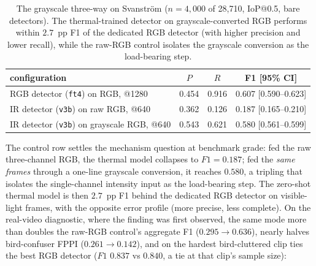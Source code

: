 \begin{table}[htbp]
    \centering
    \caption{The grayscale three-way on Svanstr\"om ($n=4{,}000$ of 28{,}710, IoP@0.5, bare detectors). The thermal-trained detector on grayscale-converted RGB performs within $2.7$~pp F1 of the dedicated RGB detector (with higher precision and lower recall), while the raw-RGB control isolates the grayscale conversion as the load-bearing step.}
    \label{tab:gray_threeway}
    \begin{tabular}{lccc}
        \toprule
        configuration & $P$ & $R$ & F1 [95\% CI] \\
        \midrule
        RGB detector (\texttt{ft4}) on RGB, @1280 & 0.454 & 0.916 & 0.607 [0.590--0.623] \\
        IR detector (\texttt{v3b}) on raw RGB, @640 & 0.362 & 0.126 & 0.187 [0.165--0.210] \\
        IR detector (\texttt{v3b}) on grayscale RGB, @640 & 0.543 & 0.621 & 0.580 [0.561--0.599] \\
        \bottomrule
    \end{tabular}
\end{table}

The control row settles the mechanism question at benchmark grade: fed the raw three-channel RGB, the thermal model collapses to $F1=0.187$; fed the \emph{same frames} through a one-line grayscale conversion, it reaches $0.580$, a tripling that isolates the single-channel intensity input as the load-bearing step. The zero-shot thermal model is then $2.7$~pp F1 behind the dedicated RGB detector on visible-light frames, with the opposite error profile (more precise, less complete). On the real-video diagnostic, where the finding was first observed, the same mode more than doubles the raw-RGB control's aggregate F1 ($0.295 \to 0.636$), nearly halves bird-confuser FPPI ($0.261 \to 0.142$), and on the hardest bird-cluttered clip ties the best RGB detector ($F1$ $0.837$ vs $0.840$, a tie at that clip's sample size):

